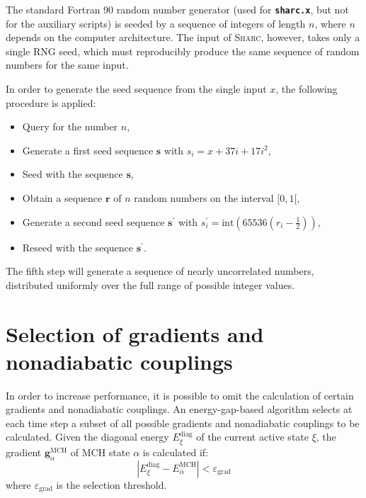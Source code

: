 \documentclass[a4paper,10pt,DIV=15,openany]{scrbook}
\newcommand{\sharc}{\textsc{Sharc}}
\newcommand{\ttt}[1]{\textbf{\texttt{#1}}}
\newcommand{\VEC}[1]{\ensuremath{\mathbf{#1}}}
\begin{document}
The standard Fortran 90 random number generator (used for \ttt{sharc.x}, but not for the auxiliary scripts) is seeded by a sequence of integers of length $n$, where $n$ depends on the computer architecture. The input of \sharc, however, takes only a single RNG seed, which must reproducibly produce the same sequence of random numbers for the same input.

In order to generate the seed sequence from the single input $x$, the following procedure is applied:
\begin{itemize}
  \item Query for the number $n$,
  \item Generate a first seed sequence $\VEC{s}$ with $s_i=x+37i+17i^2$,
  \item Seed with the sequence $\VEC{s}$,
  \item Obtain a sequence $\VEC{r}$ of $n$ random numbers on the interval $[0,1[$,
  \item Generate a second seed sequence $\VEC{s}^\prime$ with $s_i^\prime=\text{int}\left(65536(r_i-\frac{1}{2})\right)$,
  \item Reseed with the sequence $\VEC{s}^\prime$.
\end{itemize}
The fifth step will generate a sequence of nearly uncorrelated numbers, distributed uniformly over the full range of possible integer values. 


\section{Selection of gradients and nonadiabatic couplings}\label{met:selection}

In order to increase performance, it is possible to omit the calculation of certain gradients and nonadiabatic couplings. An energy-gap-based algorithm selects at each time step a subset of all possible gradients and nonadiabatic couplings to be calculated. Given the diagonal energy $E^{\text{diag}}_\xi$ of the current active state $\xi$, the gradient $\VEC{g}^{\text{MCH}}_\alpha$ of MCH state $\alpha$ is calculated if:
\begin{equation}
  \left|
    E^{\text{diag}}_\xi - E^{\text{MCH}}_\alpha
  \right|
  <
  \varepsilon_\text{grad}
\end{equation}
where $\varepsilon_\text{grad}$ is the selection threshold.
\end{document}
